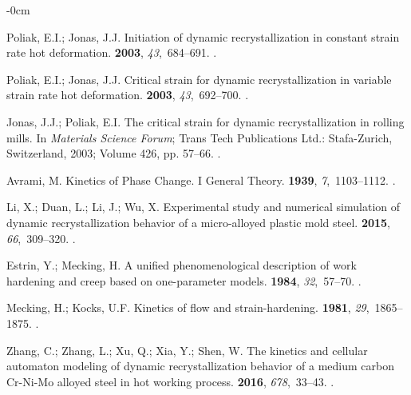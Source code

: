 \documentclass[metals,article,accept,pdftex,moreauthors]{Definitions/mdpi}
\begin{document}
\begin{adjustwidth}{-\extralength}{0cm}
\begin{thebibliography}{999}
Poliak, E.I.; Jonas, J.J.
\newblock Initiation of dynamic recrystallization in constant strain rate hot
  deformation.
 {\bf 2003}, {\em 43},~684--691.
.

Poliak, E.I.; Jonas, J.J.
\newblock Critical strain for dynamic recrystallization in variable strain rate
  hot deformation.
 {\bf 2003}, {\em 43},~692--700.
.

Jonas, J.J.; Poliak, E.I.
\newblock The critical strain for dynamic recrystallization in rolling mills.
\newblock In \emph{Materials Science Forum}; Trans Tech Publications Ltd.: Stafa-Zurich, Switzerland, %
  2003; Volume 426, pp. 57--66.
.

Avrami, M.
\newblock Kinetics of Phase Change. I General Theory.
 {\bf 1939}, {\em 7},~1103--1112.
.

Li, X.; Duan, L.; Li, J.; Wu, X.
\newblock Experimental study and numerical simulation of dynamic
  recrystallization behavior of a micro-alloyed plastic mold steel.
 {\bf 2015}, {\em 66},~309--320.
.

Estrin, Y.; Mecking, H.
\newblock A unified phenomenological description of work hardening and creep
  based on one-parameter models.
 {\bf 1984}, {\em 32},~57--70.
.

Mecking, H.; Kocks, U.F.
\newblock Kinetics of flow and strain-hardening.
 {\bf 1981}, {\em 29},~1865--1875.
.

Zhang, C.; Zhang, L.; Xu, Q.; Xia, Y.; Shen, W.
\newblock The kinetics and cellular automaton modeling of dynamic
  recrystallization behavior of a medium carbon Cr-Ni-Mo alloyed steel in hot
  working process.
 {\bf 2016}, {\em
  678},~33--43.
.


\end{thebibliography}
\end{adjustwidth}
\end{document}
